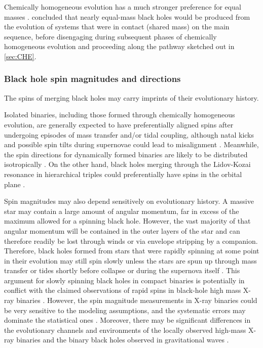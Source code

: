 \documentclass[iop,onecolumn]{revtex4-1}
\begin{document}
Chemically homogeneous evolution has a much stronger preference for equal masses \citep{MandeldeMink:2016}.  \citet{Marchant:2016} concluded that nearly equal-mass black holes would be produced from the evolution of systems that were in contact (shared mass) on the main sequence, before disengaging during subsequent phases of chemically homogeneous evolution and proceeding along the pathway sketched out in \autoref{sec:CHE}. 

\subsubsection{Black hole spin magnitudes and directions}\label{BHspins}
The spins of merging black holes may carry imprints of their evolutionary history. 

Isolated binaries, including those formed through chemically homogeneous evolution, are generally expected to have preferentially aligned spins after undergoing episodes of mass transfer and/or tidal coupling, although natal kicks and possible spin tilts during supernovae could lead to misalignment \citep[e.g.,][]{Farr:2011,Tauris:2017}.  Meanwhile, the spin directions for dynamically formed binaries are likely to be distributed isotropically \citep[e.g.,][]{Rodriguez:2016spin}.  On the other hand, black holes merging through the Lidov-Kozai resonance in hierarchical triples could preferentially have spins in the orbital plane \citep{LiuLai:2018,RodriguezAntonini:2018}.

Spin magnitudes may also depend sensitively on evolutionary history.  A massive star may contain a large amount of angular momentum, far in excess of the maximum allowed for a spinning black hole. However, the vast majority of that angular momentum will be contained in the outer layers of the star and can therefore readily be lost through winds or via envelope stripping by a companion.  Therefore, black holes formed from stars that were rapidly spinning at some point in their evolution may still spin slowly unless the stars are spun up through mass transfer or tides shortly before collapse \citep{Kushnir:2016,HotokezakaPiran:2017,Zaldarriaga:2017} or during the supernova itself \citep{Batta:2017,Schroeder:2018}.   This argument for slowly spinning black holes in compact binaries is potentially in conflict with the claimed observations of rapid spins in black-hole high mass X-ray binaries \citep{MillerMiller:2015}.     However, the spin magnitude measurements in X-ray binaries could be very sensitive to the modeling assumptions, and the systematic errors may dominate the statistical ones \citep[e.g.,][]{Basak:2017,Kawano:2017}. Moreover, there may be significant differences in the evolutionary channels and environments of the locally observed high-mass X-ray binaries and the binary black holes observed in gravitational waves \citep[][and see \autoref{environ}]{HotokezakaPiran:2017}.
\end{document}
